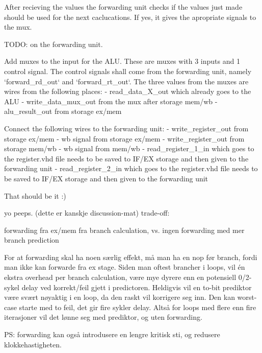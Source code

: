 After recieving the values the forwarding unit checks if the values just made should be used for the next
caclucations.
If yes, it gives the apropriate signals to the mux.


TODO: on the forwarding unit.

Add muxes to the input for the ALU.
These are muxes with 3 inputs and 1 control signal.
The control signals shall come from the forwarding unit, namely `forward\_rd\_out` and `forward\_rt\_out`.
The three values from the muxes are wires from the following places:
- read\_data\_X\_out which already goes to the ALU
- write\_data\_mux\_out from the mux after storage mem/wb
- alu\_result\_out from storage ex/mem

Connect the following wires to the forwarding unit:
- write\_register\_out from storage ex/mem
- wb signal from storage ex/mem
- write\_register\_out from storage mem/wb
- wb signal from mem/wb
- read\_register\_1\_in which goes to the register.vhd file needs to be saved to IF/EX storage
and then given to the forwarding unit
- read\_register\_2\_in which goes to the register.vhd file needs to be saved to IF/EX storage
and then given to the forwarding unit

That should be it :)

yo peeps. (dette er kanskje discussion-mat)
trade-off:

forwarding fra ex/mem fra branch calculation, vs. ingen forwarding med mer branch prediction

For at forwarding skal ha noen særlig effekt, må man ha en nop før branch, fordi man ikke kan forwarde fra ex stage.
Siden man oftest brancher i loops, vil én ekstra overhead per branch calculation, være mye dyrere enn en potensiell 0/2-sykel delay ved korrekt/feil gjett i predictoren.
Heldigvis vil en to-bit prediktor være svært nøyaktig i en loop, da den raskt vil korrigere seg inn.
Den kan worst-case starte med to feil, det gir fire sykler delay.
Altså for loops med flere enn fire iterasjoner vil det lønne seg med prediktor, og uten forwarding.

PS: forwarding kan også introdusere en lengre kritisk sti, og redusere klokkehastigheten.
